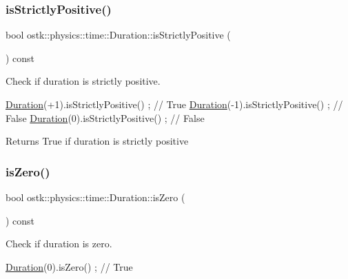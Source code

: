 \subsubsection{\texorpdfstring{is\+Strictly\+Positive()}{isStrictlyPositive()}}
{\footnotesize\ttfamily bool ostk\+::physics\+::time\+::\+Duration\+::is\+Strictly\+Positive (\begin{DoxyParamCaption}{ }\end{DoxyParamCaption}) const}



Check if duration is strictly positive. 


\begin{DoxyCode}
\hyperlink{classostk_1_1physics_1_1time_1_1_duration_a6ba3a020742ca6e3bf0b1970dd039c07}{Duration}(+1).isStrictlyPositive() ; \textcolor{comment}{// True}
\hyperlink{classostk_1_1physics_1_1time_1_1_duration_a6ba3a020742ca6e3bf0b1970dd039c07}{Duration}(-1).isStrictlyPositive() ; \textcolor{comment}{// False}
\hyperlink{classostk_1_1physics_1_1time_1_1_duration_a6ba3a020742ca6e3bf0b1970dd039c07}{Duration}(0).isStrictlyPositive() ; \textcolor{comment}{// False}
\end{DoxyCode}


\begin{DoxyReturn}{Returns}
True if duration is strictly positive 
\end{DoxyReturn}
\mbox{\label{classostk_1_1physics_1_1time_1_1_duration_a41b6aa4c574b3b98c32d5fafaa0a1fc2}} 
\subsubsection{\texorpdfstring{is\+Zero()}{isZero()}}
{\footnotesize\ttfamily bool ostk\+::physics\+::time\+::\+Duration\+::is\+Zero (\begin{DoxyParamCaption}{ }\end{DoxyParamCaption}) const}



Check if duration is zero. 


\begin{DoxyCode}
\hyperlink{classostk_1_1physics_1_1time_1_1_duration_a6ba3a020742ca6e3bf0b1970dd039c07}{Duration}(0).isZero() ; \textcolor{comment}{// True}
\end{DoxyCode}


